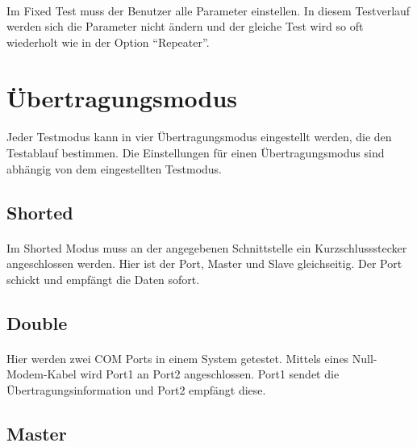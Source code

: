 \paragraph{}
Im Fixed Test muss der Benutzer alle Parameter einstellen. In diesem Testverlauf werden sich die Parameter nicht ändern und der gleiche Test wird so oft wiederholt wie in der Option "`Repeater"'.



\section{Übertragungsmodus}
\paragraph{}
Jeder Testmodus kann in vier Übertragungsmodus eingestellt werden, die den Testablauf bestimmen. Die Einstellungen für einen Übertragungsmodus sind abhängig von dem eingestellten Testmodus.


\subsection{Shorted}
\paragraph{}
Im Shorted Modus muss an der angegebenen Schnittstelle ein Kurzschlussstecker angeschlossen werden. Hier ist der Port, Master und Slave gleichseitig. Der Port schickt und empfängt die Daten sofort.


\subsection{Double}
\paragraph{}
Hier werden zwei COM Ports in einem System getestet. Mittels eines Null-Modem-Kabel wird Port1 an Port2 angeschlossen. Port1 sendet die Übertragungsinformation und Port2 empfängt diese.


\subsection{Master}
